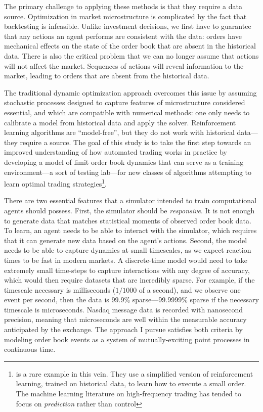 	The primary challenge to applying these methods is that they require a data source. Optimization in market microstructure is complicated by the fact that backtesting is infeasible. Unlike investment decisions, we first have to guarantee that any actions an agent performs are consistent with the data: orders have mechanical effects on the state of the order book that are absent in the historical data. There is also the critical problem that we can no longer assume that actions will not affect the market. Sequences of actions will reveal information to the market, leading to orders that are absent from the historical data.

	The traditional dynamic optimization approach overcomes this issue by assuming stochastic processes designed to capture features of microstructure considered essential, and which are compatible with numerical methods: one only needs to calibrate a model from historical data and apply the solver. Reinforcement learning algorithms are ``model-free'', but they do not work with historical data---they require a source. The goal of this study is to take the first step towards an improved understanding of how automated trading works in practice by developing a model of limit order book dynamics that can serve as a training environment---a sort of testing lab---for new classes of algorithms attempting to learn optimal trading strategies\footnote{\cite{Nevmyvaka2006} is a rare example in this vein. They use a simplified version of reinforcement learning, trained on historical data, to learn how to execute a small order. The machine learning literature on high-frequency trading has tended to focus on \textit{prediction} rather than control}.

	There are two essential features that a simulator intended to train computational agents should possess. First, the simulator should be \textit{responsive}. It is not enough to generate data that matches statistical moments of observed order book data. To learn, an agent needs to be able to interact with the simulator, which requires that it can generate new data based on the agent's actions. Second, the model needs to be able to capture dynamics at small timescales, as we expect reaction times to be fast in modern markets. A discrete-time model would need to take extremely small time-steps to capture interactions with any degree of accuracy, which would then require datasets that are incredibly sparse. For example, if the timescale necessary is milliseconds ($1/1000$ of a second), and we observe one event per second, then the data is 99.9\% sparse---99.9999\% sparse if the necessary timescale is microseconds. Nasdaq message data is recorded with nanosecond precision, meaning that microseconds are well within the measurable accuracy anticipated by the exchange. The approach I pursue satisfies both criteria by modeling order book events as a system of mutually-exciting point processes in continuous time.


